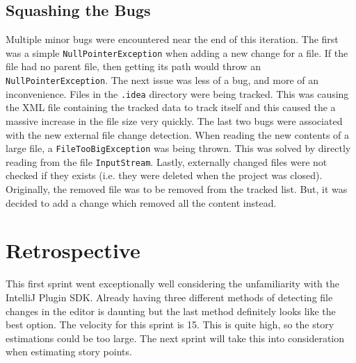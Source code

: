 \subsection{Squashing the Bugs}
Multiple minor bugs were encountered near the end of this iteration. The first was a simple \texttt{NullPointerException} when adding a new change for a file. If the file had no parent file, then getting its path would throw an \texttt{NullPointerException}. The next issue was less of a bug, and more of an inconvenience. Files in the \texttt{.idea} directory were being tracked. This was causing the XML file containing the tracked data to track itself and this caused the a massive increase in the file size very quickly. The last two bugs were associated with the new external file change detection. When reading the new contents of a large file, a \texttt{FileTooBigException} was being thrown. This was solved by directly reading from the file \texttt{InputStream}. Lastly, externally changed files were not checked if they exists (i.e. they were deleted when the project was closed). Originally, the removed file was to be removed from the tracked list. But, it was decided to add a change which removed all the content instead.

\section{Retrospective}
This first sprint went exceptionally well considering the unfamiliarity with the IntelliJ Plugin SDK. Already having three different methods of detecting file changes in the editor is daunting but the last method definitely looks like the best option. The velocity for this sprint is 15. This is quite high, so the story estimations could be too large. The next sprint will take this into consideration when estimating story points.
